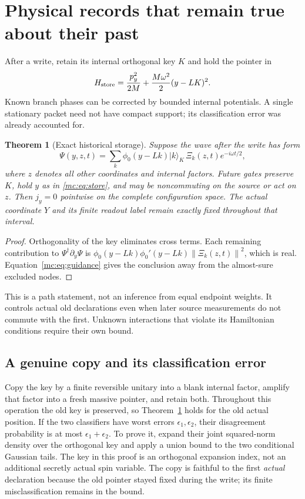 \documentclass[11pt,oneside,openany]{book}
\newtheorem{theorem}{Theorem}[chapter]
\theoremstyle{definition}
\theoremstyle{remark}\newtheorem{remark}[theorem]{Remark}
\providecommand{\ket}[1]{\lvert#1\rangle}
\providecommand{\norm}[1]{\left\lVert#1\right\rVert}
\begin{document}
\section{Physical records that remain true about their past}
\label{mc:sec:archive}
After a write, retain its internal orthogonal key $K$ and hold the pointer in
\begin{equation}\label{mc:eq:store}
 H_{\rm store}=\frac{p_y^2}{2M}+\frac{M\omega^2}{2}(y-LK)^2.
\end{equation}
Known branch phases can be corrected by bounded internal potentials. A single stationary packet need not have compact support; its classification error was already accounted for.

\begin{theorem}[Exact historical storage]\label{mc:thm:store}
Suppose the wave after the write has form
\begin{equation}\label{mc:eq:storedwave}
 \Psi(y,z,t)=\sum_k\phi_0(y-Lk)\ket k_K\,\Xi_k(z,t)e^{-i\omega t/2},
\end{equation}
where $z$ denotes all other coordinates and internal factors. Future gates preserve $K$, hold $y$ as in \eqref{mc:eq:store}, and may be noncommuting on the source or act on $z$. Then $j_y=0$ \emph{pointwise} on the complete configuration space. The actual coordinate $Y$ and its finite readout label remain exactly fixed throughout that interval.
\end{theorem}
\begin{proof}
Orthogonality of the key eliminates cross terms. Each remaining contribution to $\Psi^\dagger\partial_y\Psi$ is $\phi_0(y-Lk)\phi_0'(y-Lk)\norm{\Xi_k(z,t)}^2$, which is real. Equation~\eqref{mc:eq:guidance} gives the conclusion away from the almost-sure excluded nodes.
\end{proof}
This is a path statement, not an inference from equal endpoint weights. It controls actual old declarations even when later source measurements do not commute with the first. Unknown interactions that violate its Hamiltonian conditions require their own bound.

\subsection{A genuine copy and its classification error}
Copy the key by a finite reversible unitary into a blank internal factor, amplify that factor into a fresh massive pointer, and retain both. Throughout this operation the old key is preserved, so Theorem~\ref{mc:thm:store} holds for the old actual position. If the two classifiers have worst errors $\epsilon_1,\epsilon_2$, their disagreement probability is at most $\epsilon_1+\epsilon_2$. To prove it, expand their joint squared-norm density over the orthogonal key and apply a union bound to the two conditional Gaussian tails. The key in this proof is an orthogonal expansion index, not an additional secretly actual spin variable. The copy is faithful to the first \emph{actual} declaration because the old pointer stayed fixed during the write; its finite misclassification remains in the bound.
\end{document}
